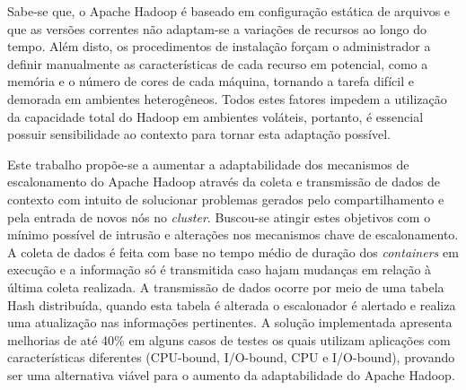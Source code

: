 Sabe-se que, o Apache Hadoop é baseado em configuração estática de arquivos e que as versões correntes não adaptam-se a variações de recursos ao longo do tempo. Além disto, os procedimentos de instalação forçam o administrador a definir manualmente as características de cada recurso em potencial, como a memória e o número de cores de cada máquina, tornando a tarefa difícil e demorada em ambientes heterogêneos. Todos estes fatores impedem a utilização da capacidade total do Hadoop em ambientes voláteis, portanto, é essencial possuir sensibilidade ao contexto para tornar esta adaptação possível.

Este trabalho propõe-se a aumentar a adaptabilidade dos mecanismos de escalonamento do Apache Hadoop através da coleta e transmissão de dados de contexto com intuito de solucionar problemas gerados pelo compartilhamento e  pela entrada de novos nós no \textit{cluster}. Buscou-se atingir estes objetivos com o mínimo possível de intrusão e alterações nos mecanismos chave de escalonamento. A coleta de dados é feita com base no tempo médio de duração dos \textit{containers} em execução e a informação só é transmitida caso hajam mudanças em relação à última coleta realizada. A transmissão de dados ocorre por meio de uma tabela Hash distribuída, quando esta tabela é alterada o escalonador é alertado e realiza uma atualização nas informações pertinentes. A solução implementada apresenta melhorias de até 40\% em alguns casos de testes os quais utilizam aplicações com características diferentes (CPU-bound, I/O-bound, CPU e I/O-bound), provando ser uma alternativa viável para o aumento da adaptabilidade do Apache Hadoop.

%
%
%
%
